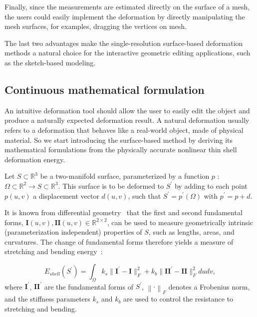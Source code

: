 Finally, since the measurements are estimated directly on the surface of a mesh, the users could easily implement the deformation by directly manipulating the mesh surfaces, for examples, dragging the vertices on mesh.

The last two advantages make the single-resolution surface-based deformation methods a natural choice for the interactive geometric editing applications, such as the sketch-based modeling.

\subsection{Continuous mathematical formulation}\label{ch2:sec:deformation:formula}

An intuitive deformation tool should allow the user to easily edit the object and produce a naturally expected deformation result. A natural deformation usually refers to a deformation that behaves like a real-world object, made of physical material. So we start introducing the surface-based method by deriving its mathematical formulations from the physically accurate nonlinear thin shell deformation energy.

Let $S \subset \mathbb{R}^3$ be a two-manifold surface, parameterized by a function $p$ : $\Omega \subset \mathbb{R}^2 \to S \subset \mathbb{R}^3$. This surface is to be deformed to $S^\prime$ by adding to each point $p(u,v)$ a displacement vector $d(u,v)$, such that $S^\prime = p^\prime (\Omega)$ with $p^\prime= p + d$.

It is known from differential geometry~\cite{MPDC76} that the first and second fundamental forms, $\textbf{I}(u,v), \textbf{II}(u,v) \in \mathbb{R}^{2 \times 2}$, can be used to measure geometrically intrinsic (parameterization independent) properties of $S$, such as lengths, areas, and curvatures. The change of fundamental forms therefore yields a measure of stretching and bending energy~\cite{TPBF87}:

\begin{equation}
\label{eq:thinshell}
E_{shell}(S^\prime)= \int_{\Omega}{k_s \Big\|{\textbf{I}^\prime-\textbf{I}}\Big\|_{F}^2+
k_b \Big\|{\textbf{II}^\prime-\textbf{II}}\Big\|_{F}^2 dudv} ,
\end{equation}
where $\textbf{I}^\prime$, $\textbf{II}^\prime$ are the fundamental forms of $S^\prime$, $\left\| \cdot \right\| _F$ denotes a Frobenius norm, and the stiffness parameters $k_s$ and $k_b$ are used to control the resistance to stretching and bending.

